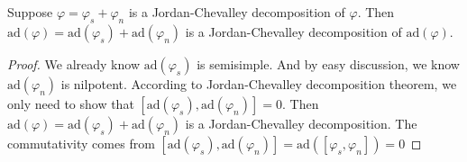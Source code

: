 \begin{theorem}
    Suppose $\varphi=\varphi_s+\varphi_n$ is a Jordan-Chevalley decomposition of $\varphi$. Then $\mathrm{ad}(\varphi)=\mathrm{ad}(\varphi_s)+\mathrm{ad}(\varphi_n)$ is a Jordan-Chevalley decomposition of $\mathrm{ad}(\varphi)$.
\end{theorem}

\begin{proof}
    We already know $\mathrm{ad}(\varphi_s)$ is semisimple. And by easy discussion, we know $\mathrm{ad}(\varphi_n)$ is nilpotent. According to Jordan-Chevalley decomposition theorem, we only need to show that $[\mathrm{ad}(\varphi_s),\mathrm{ad}(\varphi_n)]=0$. Then $\mathrm{ad}(\varphi)=\mathrm{ad}(\varphi_s)+\mathrm{ad}(\varphi_n)$ is a Jordan-Chevalley decomposition. The commutativity comes from $[\mathrm{ad}(\varphi_s),\mathrm{ad}(\varphi_n)]=\mathrm{ad}([\varphi_s,\varphi_n])=0$
\end{proof}

